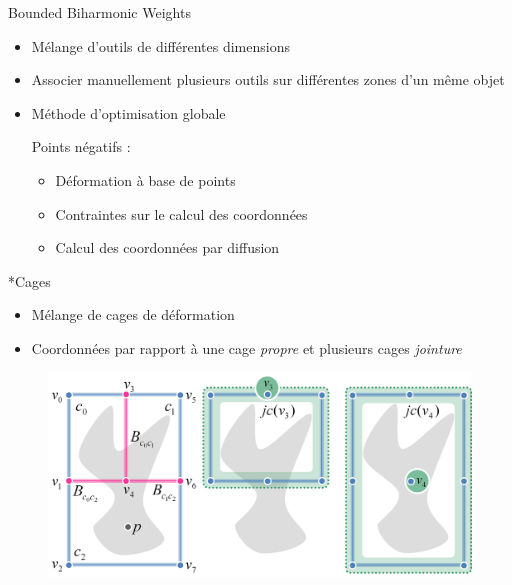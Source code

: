 \documentclass[xcolor=x11names,compress]{beamer}
\renewcommand{\(}{\begin{columns}} \renewcommand{\)}{\end{columns}}
\newcommand{\<}[1]{\begin{column}{#1}} \renewcommand{\>}{\end{column}}
\begin{document}
\begin{frame}{Bounded Biharmonic Weights}
  \begin{itemize}
  \item Mélange d'outils de différentes dimensions
  \item Associer manuellement plusieurs outils sur différentes zones
    d'un même objet
  \item Méthode d'optimisation globale
    \begin{alertblock}{Points négatifs : }
      \begin{itemize}
      \item Déformation à base de points
      \item Contraintes sur le calcul des coordonnées
      \item Calcul des coordonnées par diffusion
      \end{itemize}
    \end{alertblock}
  \end{itemize}
\end{frame}

\begin{frame}{*Cages}
  \begin{itemize}
  \item Mélange de cages de déformation
  \item Coordonnées par rapport à une cage \textit{propre} et
    plusieurs cages \textit{jointure}
  \end{itemize}
  \begin{figure}[h]
    \begin{center}
      \includegraphics[scale=0.07]{joinCages}
    \end{center}
    \caption{\cite{GPCP13}}
  \end{figure}
\end{frame}

\end{document}
